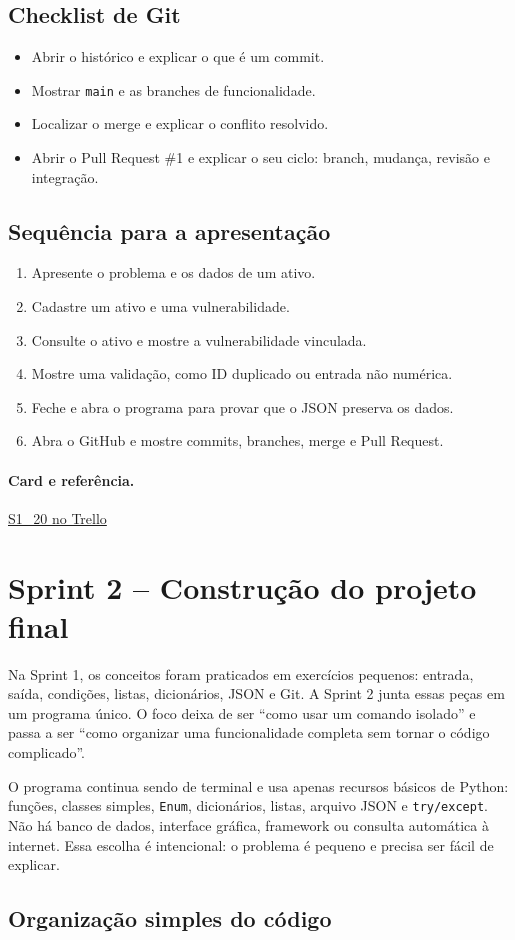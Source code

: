 \documentclass[11pt,a4paper]{article}
\newcommand{\referencia}[2]{\paragraph{Card e referência.}\href{#1}{#2}}
\newcommand{\cardsection}[1]{\Needspace{12\baselineskip}\subsection{#1}}
\begin{document}
\cardsection{Checklist de Git}
\begin{itemize}
  \item Abrir o histórico e explicar o que é um commit.
  \item Mostrar \texttt{main} e as branches de funcionalidade.
  \item Localizar o merge e explicar o conflito resolvido.
  \item Abrir o Pull Request \#1 e explicar o seu ciclo: branch, mudança, revisão e integração.
\end{itemize}

\cardsection{Sequência para a apresentação}
\begin{enumerate}
  \item Apresente o problema e os dados de um ativo.
  \item Cadastre um ativo e uma vulnerabilidade.
  \item Consulte o ativo e mostre a vulnerabilidade vinculada.
  \item Mostre uma validação, como ID duplicado ou entrada não numérica.
  \item Feche e abra o programa para provar que o JSON preserva os dados.
  \item Abra o GitHub e mostre commits, branches, merge e Pull Request.
\end{enumerate}

\referencia{https://trello.com/c/X3LzSoi0}{S1\_20 no Trello}

\clearpage
\section{Sprint 2 -- Construção do projeto final}

Na Sprint 1, os conceitos foram praticados em exercícios pequenos: entrada, saída, condições, listas, dicionários, JSON e Git. A Sprint 2 junta essas peças em um programa único. O foco deixa de ser ``como usar um comando isolado'' e passa a ser ``como organizar uma funcionalidade completa sem tornar o código complicado''.

O programa continua sendo de terminal e usa apenas recursos básicos de Python: funções, classes simples, \texttt{Enum}, dicionários, listas, arquivo JSON e \texttt{try/except}. Não há banco de dados, interface gráfica, framework ou consulta automática à internet. Essa escolha é intencional: o problema é pequeno e precisa ser fácil de explicar.

\cardsection{Organização simples do código}
\end{document}
